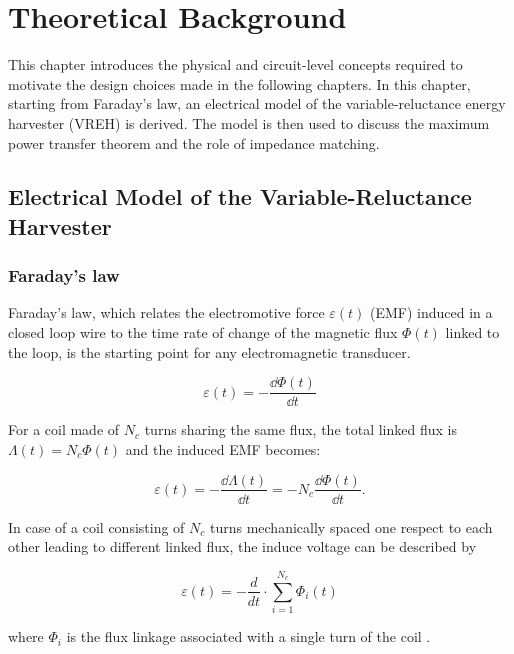 \chapter{Theoretical Background}
\label{ch:theory}

This chapter introduces the physical and circuit-level concepts required to motivate the design choices made in the following chapters.
In this chapter, starting from Faraday's law, an electrical
model of the variable-reluctance energy harvester (VREH) is
derived. The model is then used to discuss the maximum
power transfer theorem and the role of impedance matching.

\section{Electrical Model of the Variable-Reluctance Harvester}


\subsection{Faraday's law}
\label{sec:faraday_law}

Faraday's law, which relates the electromotive force $\varepsilon(t)$ (EMF) induced in a closed loop wire to the time rate of change of the magnetic flux $\Phi(t)$ linked to the loop, is the starting point for any electromagnetic transducer.

\begin{equation}
    \varepsilon(t) = -\frac{\dd \Phi(t)}{\dd t}
    \label{eq:faraday}
\end{equation}

For a coil made of $N_c$ turns sharing the same flux, the total linked flux is $\Lambda(t)=N_c\Phi(t)$ and the induced EMF becomes:

\begin{equation}
    \varepsilon(t) = -\frac{\dd \Lambda(t)}{\dd t} = -N_c\frac{\dd \Phi(t)}{\dd t}.
    \label{eq:faraday_N}
\end{equation}

In case of a coil consisting of $N_c$ turns mechanically spaced one respect to each other leading to different linked flux, the induce voltage can be described by

\begin{equation}
    \varepsilon(t) = -\frac{d}{dt} \cdot \sum_{i=1}^{N_c} \Phi_i(t)
\label{eq:faraday_dis}
\end{equation}


where $\Phi_i$ is the flux linkage associated with a single turn of the coil \cite{xuSurveyVariableReluctance2018}.

